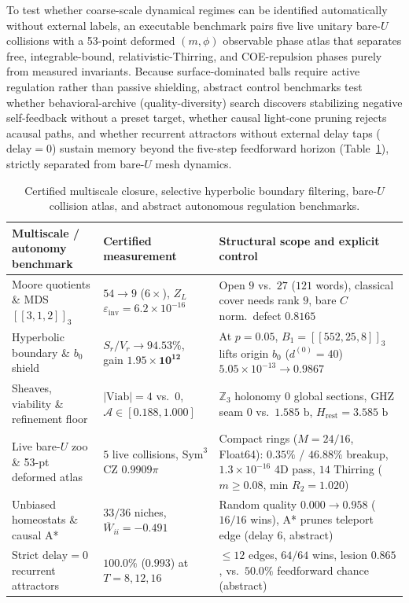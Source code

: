 To test whether coarse-scale dynamical regimes can be identified automatically without external labels, an executable
benchmark pairs five live unitary bare-$U$ collisions with a 53-point deformed $(m, \phi)$ observable phase atlas that
separates free, integrable-bound, relativistic-Thirring, and COE-repulsion phases purely from measured invariants.
Because surface-dominated balls require active regulation rather than passive shielding, abstract control benchmarks
test whether behavioral-archive (quality-diversity) search discovers stabilizing negative self-feedback without a preset
target, whether causal light-cone pruning rejects acausal paths, and whether recurrent attractors without external delay
taps ($\mathrm{delay} = 0$) sustain memory beyond the five-step feedforward horizon
(Table~\ref{tab:multiscale-autonomy}), strictly separated from bare-$U$ mesh dynamics.

\begin{table}[tb]
\centering
\caption{Certified multiscale closure, selective hyperbolic boundary filtering, bare-$U$ collision atlas, and abstract
autonomous regulation benchmarks.}
\label{tab:multiscale-autonomy}
\footnotesize
\begin{tabularx}{\textwidth}{@{}>{\raggedright\arraybackslash}p{4.05cm}>{\raggedright\arraybackslash}p{3.50cm}>{\raggedright\arraybackslash}X@{}}
\toprule
Multiscale / autonomy benchmark & Certified measurement & Structural scope and explicit control \\
\midrule
Moore quotients \& MDS $[[3,1,2]]_3$ & $54 \to 9$ ($6\times$), $Z_L$ $\varepsilon_{\mathrm{inv}} = 6.2 \times 10^{-16}$ & Open $9$ vs.\ $27$ ($121$ words), classical cover needs rank $9$, bare $C$ norm.\ defect $0.8165$ \\
\addlinespace[2pt]
Hyperbolic boundary \& $b_0$ shield & $S_r/V_r \to \mathbf{94.53\%}$, gain $\mathbf{1.95 \times 10^{12}}$ & At $p = 0.05$, $B_1 = [[552,25,8]]_3$ lifts origin $b_0$ ($d^{(0)}{=}40$) $5.05 \times 10^{-13} \to 0.9867$ \\
\addlinespace[2pt]
Sheaves, viability \& refinement floor & $|\mathrm{Viab}| = 4$ vs.\ $0$, $\mathcal{A} \in [0.188, 1.000]$ & $\mathbb{Z}_3$ holonomy $0$ global sections, GHZ seam $0$ vs.\ $1.585\text{ b}$, $H_{\mathrm{rest}} = 3.585\text{ b}$ \\
\addlinespace[2pt]
Live bare-$U$ zoo \& 53-pt deformed atlas & $5$ live collisions, $\mathrm{Sym}^3$ CZ $0.9909\pi$ & Compact rings ($M = 24/16$, Float64): $0.35\%$ / $46.88\%$ breakup, $1.3 \times 10^{-16}$ 4D pass, $14$ Thirring ($m \ge 0.08$, min $R_2 = 1.020$) \\
\addlinespace[2pt]
Unbiased homeostats \& causal A* & $33/36$ niches, $\overline{W}_{ii} = -0.491$ & Random quality $0.000 \to 0.958$ ($16/16$ wins), A* prunes teleport edge (delay $6$, abstract) \\
\addlinespace[2pt]
Strict $\mathrm{delay} = 0$ recurrent attractors & $\mathbf{100.0\%}$ ($0.993$) at $T = 8, 12, 16$ & $\le 12$ edges, $64/64$ wins, lesion $0.865$, vs.\ $50.0\%$ feedforward chance (abstract) \\
\bottomrule
\end{tabularx}
\end{table}

